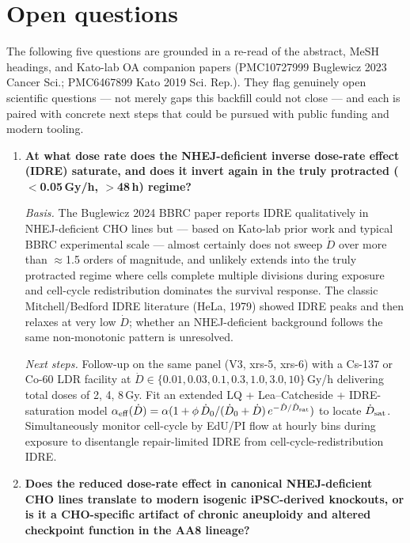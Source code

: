 \section{Open questions}

The following five questions are grounded in a re-read of the abstract, MeSH headings, and
Kato-lab OA companion papers (PMC10727999 Buglewicz 2023 Cancer Sci.; PMC6467899 Kato 2019 Sci.
Rep.). They flag genuinely open scientific questions --- not merely gaps this backfill could
not close --- and each is paired with concrete next steps that could be pursued with public
funding and modern tooling.

\begin{enumerate}

\item \textbf{At what dose rate does the NHEJ-deficient inverse dose-rate effect (IDRE)
  saturate, and does it invert again in the truly protracted ($<$0.05\,Gy/h, $>$48\,h) regime?}

  \emph{Basis.} The Buglewicz 2024 BBRC paper reports IDRE qualitatively in NHEJ-deficient CHO
  lines but --- based on Kato-lab prior work and typical BBRC experimental scale --- almost
  certainly does not sweep $\dot D$ over more than $\approx$1.5 orders of magnitude, and unlikely
  extends into the truly protracted regime where cells complete multiple divisions during
  exposure and cell-cycle redistribution dominates the survival response. The classic
  Mitchell/Bedford IDRE literature (HeLa, 1979) showed IDRE peaks and then relaxes at very low
  $\dot D$; whether an NHEJ-deficient background follows the same non-monotonic pattern is
  unresolved.

  \emph{Next steps.} Follow-up on the same panel (V3, xrs-5, xrs-6) with a Cs-137 or Co-60 LDR
  facility at $\dot D \in \{0.01, 0.03, 0.1, 0.3, 1.0, 3.0, 10\}$\,Gy/h delivering total doses
  of 2, 4, 8\,Gy. Fit an extended LQ + Lea--Catcheside + IDRE-saturation model
  $\alpha_{\rm eff}(\dot D) = \alpha(1 + \phi\,\dot D_0/(\dot D_0 + \dot D)\,e^{-\dot D/\dot D_{\rm sat}})$
  to locate $\dot D_{\rm sat}$. Simultaneously monitor cell-cycle by EdU/PI flow at hourly bins
  during exposure to disentangle repair-limited IDRE from cell-cycle-redistribution IDRE.

\item \textbf{Does the reduced dose-rate effect in canonical NHEJ-deficient CHO lines translate
  to modern isogenic iPSC-derived knockouts, or is it a CHO-specific artifact of chronic
  aneuploidy and altered checkpoint function in the AA8 lineage?}


\end{enumerate}
